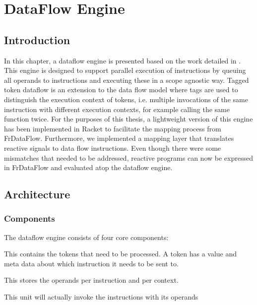 \chapter{DataFlow Engine}

\section{Introduction}

In this chapter, a dataflow engine is presented based on the work detailed in \citet{saey_extensible_2017}.
This engine is designed to support parallel execution of instructions by queuing all operands to instructions and executing these in a scope agnostic way.
Tagged token dataflow is an extension to the data flow model where tags are used to distinguish the execution context of tokens, i.e. multiple invocations of the same instruction with different execution contexts, for example calling the same function twice.
For the purposes of this thesis, a lightweight version of this engine has been implemented in Racket to facilitate the mapping process from FrDataFlow. Furthermore, we implemented a mapping layer that translates reactive signals to data flow instructions. Even though there were some mismatches that needed to be addressed, reactive programs can now be expressed in FrDataFlow and evaluated atop the dataflow engine. 

\newpage
\section{Architecture}

\subsection{Components}

The dataflow engine consists of four core components:

\begin{description}[style=nextline]
	\item[The token queue] This contains the tokens that need to be processed. A token has a value and meta data about which instruction it needs to be sent to. 
	\item[The matching memory] This stores the operands per instruction and per context.
	\item[The execution unit] This unit will actually invoke the instructions with its operands
\end{description}

